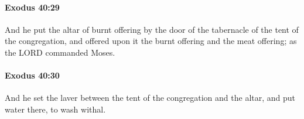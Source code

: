 		\paragraph{Exodus 40:29} %
			\label{EXODUS-40-29}

			And he put the altar of burnt offering by the door of the tabernacle of the tent of the congregation, and offered upon it the burnt offering and the meat offering; as the LORD commanded Moses.


		\paragraph{Exodus 40:30} %
			\label{EXODUS-40-30}

			And he set the laver between the tent of the congregation and the altar, and put water there, to wash withal.


